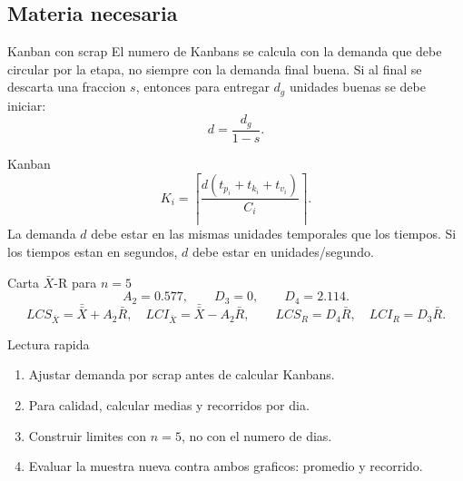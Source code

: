 \subsection{Materia necesaria}

\begin{definicion}{Kanban con scrap}
El numero de Kanbans se calcula con la demanda que debe circular por la etapa, no siempre con la demanda final buena. Si al final se descarta una fraccion \(s\), entonces para entregar \(d_g\) unidades buenas se debe iniciar:
\[
d=\frac{d_g}{1-s}.
\]
\end{definicion}

\begin{formulas}{Kanban}
\[
K_i=\left\lceil \frac{d(t_{p_i}+t_{k_i}+t_{v_i})}{C_i}\right\rceil.
\]
La demanda \(d\) debe estar en las mismas unidades temporales que los tiempos. Si los tiempos estan en segundos, \(d\) debe estar en unidades/segundo.
\end{formulas}

\begin{formulas}{Carta \(\bar X\)-R para \(n=5\)}
\[
A_2=0.577,\qquad D_3=0,\qquad D_4=2.114.
\]
\[
LCS_{\bar X}=\bar{\bar X}+A_2\bar R,\quad
LCI_{\bar X}=\bar{\bar X}-A_2\bar R,
\qquad
LCS_R=D_4\bar R,\quad LCI_R=D_3\bar R.
\]
\end{formulas}

\begin{algoritmo}{Lectura rapida}
\begin{enumerate}
    \item Ajustar demanda por scrap antes de calcular Kanbans.
    \item Para calidad, calcular medias y recorridos por dia.
    \item Construir limites con \(n=5\), no con el numero de dias.
    \item Evaluar la muestra nueva contra ambos graficos: promedio y recorrido.
\end{enumerate}
\end{algoritmo}
